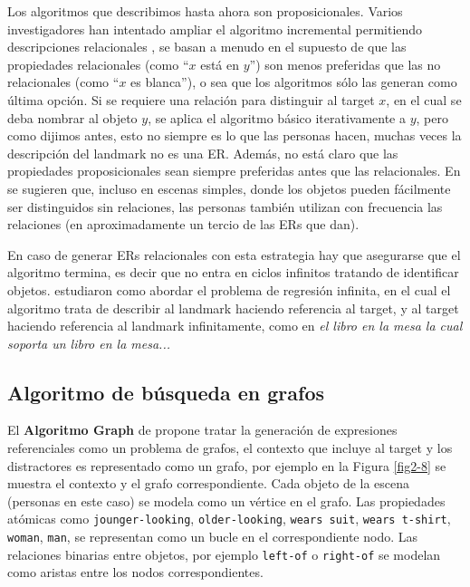 Los algoritmos que describimos hasta ahora son proposicionales. Varios investigadores han intentado ampliar el algoritmo incremental permitiendo descripciones relacionales
\cite{Horacek1997,krahmer,kelleher06:increm}, se basan a menudo
en el supuesto de que las propiedades relacionales (como ``$x$ est\'a en $y$'') son menos preferidas que
las no relacionales (como ``$x$ es blanca''), o sea que los algoritmos s\'olo las generan como \'ultima opci\'on. Si se requiere una relaci\'on para distinguir al target
$x$, en el cual se deba nombrar al objeto $y$, se aplica el algoritmo b\'asico iterativamente a $y$, pero como dijimos antes, esto no siempre es lo que las personas hacen, muchas veces la descripci\'on del landmark no es una ER. Adem\'as, no est\'a claro que las propiedades proposicionales sean siempre preferidas antes que las relacionales. En \cite{viet:gene11} se sugieren que, incluso en escenas simples, donde los objetos pueden f\'acilmente ser distinguidos
sin relaciones, las personas tambi\'en utilizan con frecuencia las relaciones (en aproximadamente un tercio de las ERs que dan).

En caso de generar ERs relacionales con esta estrategia hay que asegurarse que el algoritmo termina, es decir que no entra en ciclos infinitos 
tratando de identificar objetos. \cite{haddock} estudiaron como abordar el problema de regresi\'on infinita, en el cual el algoritmo trata de describir al landmark haciendo referencia al target, y al target haciendo referencia al landmark infinitamente, como en {\it el libro en la mesa la cual soporta un libro en la mesa... }


\subsection{Algoritmo de b\'usqueda en grafos}
\label{graph}

%


El {\bf Algoritmo Graph} de \cite{graph} propone tratar la generaci\'on de expresiones referenciales como un problema de grafos, el contexto que incluye al target y los distractores es representado como un grafo, por ejemplo en la Figura \ref{fig2-8} se muestra el contexto y el grafo correspondiente. Cada objeto de la escena (personas en este caso) se modela como un v\'ertice en el grafo. Las propiedades at\'omicas como \texttt{jounger-looking}, \texttt{older-looking}, \texttt{wears suit}, \texttt{wears t-shirt}, \texttt{woman}, \texttt{man}, se representan como un bucle en el correspondiente nodo. Las relaciones binarias entre objetos, por ejemplo \texttt{left-of} o \texttt{right-of} se modelan como aristas entre los nodos correspondientes.

